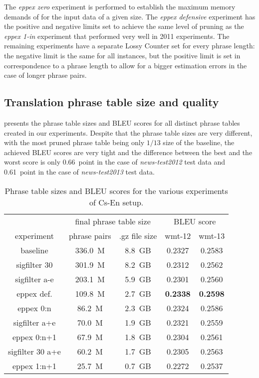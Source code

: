 The \emph{eppex zero} experiment is performed to establish the maximum memory demands of \eppex{}
for the input data of a given size.
The \emph{eppex defensive} experiment has the positive and negative limits set to achieve the same
level of pruning as the \emph{eppex 1-in} experiment that performed very well in 2011 experiments.
The remaining \eppex{} experiments have a separate Lossy Counter set for every phrase length:
the negative limit is the same for all instances, but the positive limit is set in correspondence
to a phrase length to allow for a bigger estimation errors in the case of longer phrase pairs.

\subsection{Translation phrase table size and quality}

 presents the phrase table sizes and BLEU scores for all
distinct phrase tables created in our experiments.
Despite that the phrase table sizes are very different, with the most pruned phrase table being
only $1/13$ size of the baseline, the achieved BLEU scores are very tight and the difference
between the best and the worst score is only 0.66~point in the case of \emph{news-test2012} test data
and 0.61~point in the case of \emph{news-test2013} test data.

\begin{table}[ht]
\centering
\begin{tabular}{ | c | c c | c c | }
\hline
 & \multicolumn{2}{|c|}{final phrase table size} & \multicolumn{2}{|c|}{BLEU score} \\
experiment & phrase pairs & .gz file size & wmt-12 & wmt-13 \\
\hline
\hline
baseline          & 336.0~M & 8.8~GB & 0.2327 & 0.2583 \\
sigfilter 30      & 301.9~M & 8.2~GB & 0.2312 & 0.2562 \\
sigfilter a-e     & 203.1~M & 5.9~GB & 0.2301 & 0.2560 \\
eppex def.        & 109.8~M & 2.7~GB & \textbf{0.2338} & \textbf{0.2598} \\
eppex 0:n         &  86.2~M & 2.3~GB & 0.2324 & 0.2586 \\
sigfilter a+e     &  70.0~M & 1.9~GB & 0.2321 & 0.2559 \\
eppex 0:n+1       &  67.9~M & 1.8~GB & 0.2304 & 0.2561 \\
sigfilter 30 a+e  &  60.2~M & 1.7~GB & 0.2305 & 0.2563 \\
eppex 1:n+1       &  25.7~M & 0.7~GB & 0.2272 & 0.2537 \\
\hline
\end{tabular}
\caption{\label{cs-en-wmt13-pt-size-and-bleu}
Phrase table sizes and BLEU scores for the various experiments of Cs-En setup.}
\end{table}

